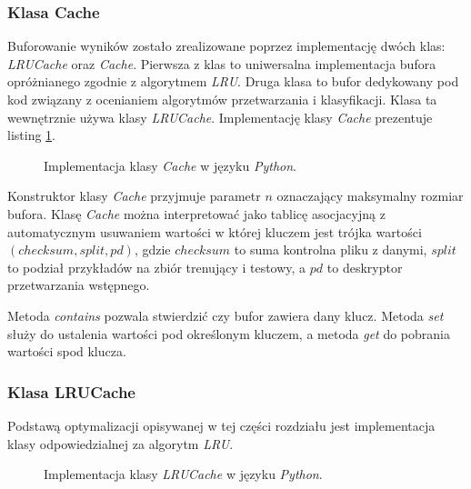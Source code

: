 \documentclass[../thesis.tex]{subfiles}
\begin{document}
\subsubsection{Klasa Cache}

Buforowanie wyników zostało zrealizowane poprzez implementację dwóch klas: \emph{LRUCache} oraz \emph{Cache}. Pierwsza z klas to uniwersalna implementacja bufora opróżnianego zgodnie z algorytmem \emph{LRU}. Druga klasa to bufor dedykowany pod kod związany z ocenianiem algorytmów przetwarzania i klasyfikacji. Klasa ta wewnętrznie używa klasy \emph{LRUCache}. Implementację klasy \emph{Cache} prezentuje listing \ref{impl:snippet_cache}.

\begin{figure}[h]
\centering
{}

\caption{Implementacja klasy \emph{Cache} w języku \emph{Python}.}
\label{impl:snippet_cache}
\end{figure}

Konstruktor klasy \emph{Cache} przyjmuje parametr $n$ oznaczający maksymalny rozmiar bufora. Klasę \emph{Cache} można interpretować jako tablicę asocjacyjną z automatycznym usuwaniem wartości w której kluczem jest trójka wartości $(checksum, split, pd)$, gdzie $checksum$ to suma kontrolna pliku z danymi, $split$ to podział przykładów na zbiór trenujący i testowy, a $pd$ to deskryptor przetwarzania wstępnego.

Metoda \emph{contains} pozwala stwierdzić czy bufor zawiera dany klucz. Metoda \emph{set} służy do ustalenia wartości pod określonym kluczem, a metoda \emph{get} do pobrania wartości spod klucza.

\subsubsection{Klasa LRUCache}

Podstawą optymalizacji opisywanej w tej części rozdziału jest implementacja klasy odpowiedzialnej za algorytm \emph{LRU}.

\begin{figure}[h]
\centering
{}

\caption{Implementacja klasy \emph{LRUCache} w języku \emph{Python}.}
\label{impl:snippet_lru}
\end{figure}
\end{document}
